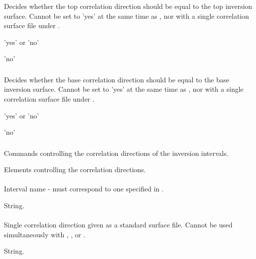 \subsubsection{}
 \slist
   \item \Description Decides whether the top correlation direction should be equal to the top inversion surface. Cannot be set to 'yes' at the same time as , nor with a single correlation surface file under .
   \item \Argument 'yes' or 'no'
   \item \Default 'no'
 \elist

\subsubsection{}
 \slist
   \item \Description Decides whether the base correlation direction should be equal to the base inversion surface. Cannot be set to 'yes' at the same time as , nor with a single correlation surface file under .
   \item \Argument 'yes' or 'no'
   \item \Default 'no'
 \elist
 
\subsubsection{}
 \slist
   \item \Description Commands controlling the correlation directions of the inversion intervals.
   \item \Argument Elements controlling the correlation directions.
   \item \Default
 \elist

\paragraph{}
 \slist
   \item \Description Interval name - must correspond to one specified in .
   \item \Argument String.
   \item \Default
 \elist

\paragraph{}
 \slist
   \item \Description Single correlation direction given as a standard surface file. Cannot be used simultaneously with , ,  or .
   \item \Argument String.
   \item \Default
 \elist


